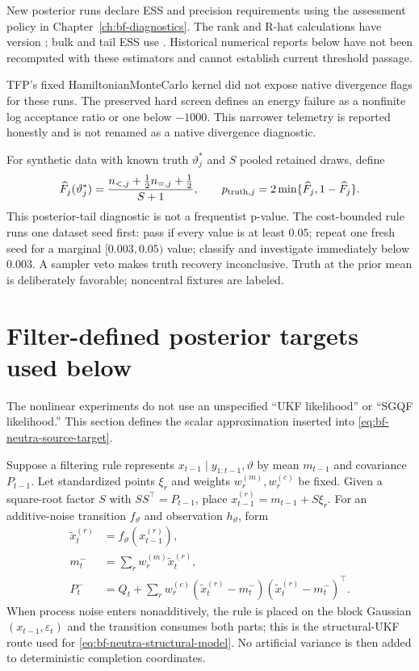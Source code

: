 New posterior runs declare ESS and precision requirements using the assessment
policy in Chapter~\ref{ch:bf-diagnostics}. The rank and R-hat calculations have
version ; bulk and tail ESS use
.
Historical numerical reports below have not been recomputed with these
estimators and cannot establish current threshold passage.

TFP's fixed HamiltonianMonteCarlo kernel did not expose native divergence flags
for these runs.  The preserved hard screen defines an energy failure as a
nonfinite log acceptance ratio or one below $-1000$.  This narrower telemetry
is reported honestly and is not renamed as a native divergence diagnostic.

For synthetic data with known truth $\vartheta_j^*$ and $S$ pooled retained
draws, define
\begin{equation}
 \widehat F_j(\vartheta_j^*)=
 \frac{n_{<,j}+\tfrac12n_{=,j}+\tfrac12}{S+1},\qquad
 p_{{\rm truth},j}=2\min\{\widehat F_j,1-\widehat F_j\}.
 \label{eq:bf-neutra-truth-tail}
\end{equation}
This posterior-tail diagnostic is not a frequentist p-value.  The cost-bounded
rule runs one dataset seed first: pass if every value is at least $0.05$;
repeat one fresh seed for a marginal $[0.003,0.05)$ value; classify and
investigate immediately below $0.003$.  A sampler veto makes truth recovery
inconclusive.  Truth at the prior mean is deliberately favorable; noncentral
fixtures are labeled.

\section{Filter-defined posterior targets used below}
\label{sec:bf-neutra-filter-targets}

The nonlinear experiments do not use an unspecified ``UKF likelihood'' or
``SGQF likelihood.''  This section defines the scalar approximation inserted
into \eqref{eq:bf-neutra-source-target}.

Suppose a filtering rule represents $x_{t-1}\mid y_{1:t-1},\vartheta$ by mean
$m_{t-1}$ and covariance $P_{t-1}$.  Let standardized points $\xi_r$ and
weights $w_r^{(m)},w_r^{(c)}$ be fixed.  Given a square-root factor $S$ with
$SS^\top=P_{t-1}$, place $x_{t-1}^{(r)}=m_{t-1}+S\xi_r$.  For an
additive-noise transition $f_\vartheta$ and observation $h_\vartheta$, form
\begin{align}
 \widetilde x_t^{(r)}&=f_\vartheta(x_{t-1}^{(r)}),\\
 m_t^-&=\sum_rw_r^{(m)}\widetilde x_t^{(r)},\\
 P_t^-&=Q_t+\sum_rw_r^{(c)}
   (\widetilde x_t^{(r)}-m_t^-)(\widetilde x_t^{(r)}-m_t^-)^\top.
 \label{eq:bf-neutra-filter-predict}
\end{align}
When process noise enters nonadditively, the rule is placed on the block
Gaussian $(x_{t-1},\varepsilon_t)$ and the transition consumes both parts; this
is the structural-UKF route used for
\eqref{eq:bf-neutra-structural-model}.  No artificial variance is then added
to deterministic completion coordinates.

